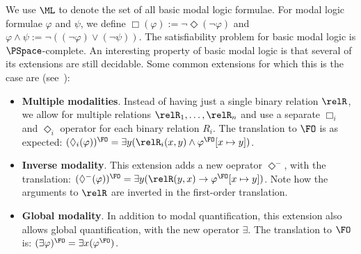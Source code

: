 We use $\ML$ to denote the set of all basic modal logic formulae.
For modal logic formulae $\varphi$ and $\psi$, we define $\Box(\varphi) := \neg \Diamond(\neg \varphi)$ and $\varphi \land \psi := \neg ((\neg \varphi) \lor (\neg \psi))$.
The satisfiability problem for basic modal logic is $\PSpace$-complete\cite{ladner1977}.
An interesting property of basic modal logic is that several of its extensions are still decidable.
Some common extensions for which this is the case are (see~\cite[Sec. 5.1]{goranko2007}):
\begin{itemize}
  \item
        \textbf{Multiple modalities}.
        Instead of having just a single binary relation $\relR$, we allow for multiple relations $\relR_1, \ldots, \relR_{n}$ and use a separate $\Box_{i}$ and $\Diamond_{i}$ operator for each binary relation $R_{i}$.
        The translation to $\FO$ is as expected: $(\Diamond_{i}(\varphi))^{\FO} = \exists{y}(\relR_{i}(x,y) \land \varphi^{\FO}[x \mapsto y])$.
  \item
        \textbf{Inverse modality}.
        This extension adds a new oeprator $\Diamond^{-}$, with the translation: $(\Diamond^{-}(\varphi))^{\FO} = \exists{y}(\relR(y,x) \to \varphi^{\FO}[x \mapsto y])$.
        Note how the arguments to $\relR$ are inverted in the first-order translation.
  \item
        \textbf{Global modality}.
        In addition to modal quantification, this extension also allows global quantification, with the new operator $\exists$.
        The translation to $\FO$ is: $(\exists \varphi)^{\FO} = \exists{x}(\varphi^{\FO})$.
\end{itemize}


